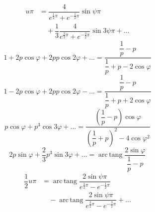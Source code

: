 \[
\begin{aligned}u\pi&=\dfrac{4}{e^{\frac12\pi}+e^{-\frac12\pi}}\sin\psi\pi
\\[7pt]&\quad{}+\dfrac13\dfrac{4}{e^{\frac32\pi}+e^{-\frac32\pi}}\sin3\psi\pi+\mathord{.}\mathord{.}\mathord{.}\end{aligned}
\]
\[
1+2p\cos\varphi+2pp\cos2\varphi+\mathord{.}\mathord{.}\mathord{.}
=\dfrac{\dfrac1p-p}{\dfrac1p+p-2\cos\varphi}
\]
\[
1-2p\cos\varphi+2pp\cos2\varphi-\mathord{.}\mathord{.}\mathord{.}
=\dfrac{\dfrac1p-p}{\dfrac1p+p+2\cos\varphi}
\]
\[
p\cos\varphi+p^3\cos3\varphi+\mathord{.}\mathord{.}\mathord{.}
=\dfrac{(\dfrac1p-p)\cos\varphi}{(\dfrac1p+p)^2-4\cos\varphi^2}
\]
\[
2p\sin\varphi+\dfrac23p^3\sin3\varphi+\mathord{.}\mathord{.}\mathord{.}
=\operatorname{arc\,tang}\dfrac{2\sin\varphi}{\dfrac1p-p}
\]
\[
\begin{aligned}\dfrac12u\pi
&=\operatorname{arc\,tang}\dfrac{2\sin\psi\pi}{e^{\frac12\pi}-e^{-\frac12\pi}}
\\[7pt]&\quad{}-\operatorname{arc\,tang}\dfrac{2\sin\psi\pi}{e^{\frac32\pi}-e^{-\frac32\pi}}+\mathord{.}\mathord{.}\mathord{.}\end{aligned}
\]




